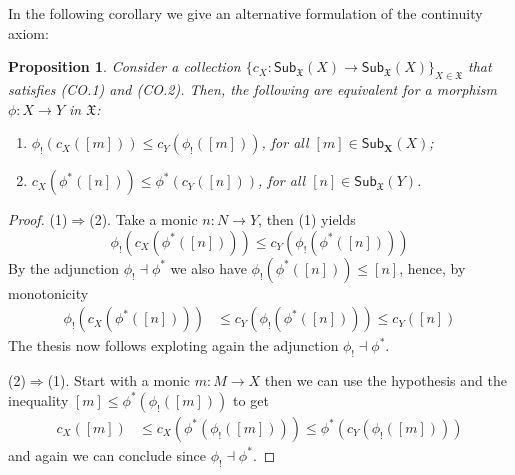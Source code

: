 \documentclass[12pt]{article}
\newtheorem{proposition}[lemma]{Proposition}
\theoremstyle{definition}
\def\X{\mathfrak X}
\numberwithin{equation}{section}
\newcommand{\catname}[1]{\mathbf{#1}}
\newcommand{\sub}[1]{\mathsf{Sub}_{\catname{#1}}}
\begin{document}
In the following corollary we give an alternative formulation of the continuity axiom:

\begin{proposition}\label{eq}
Consider a collection $\{c_X\colon \sub{\X}(X)\to \sub{\X}(X)\}_{X\in\X}$ that satisfies (CO.1) and (CO.2). Then, the following are equivalent for a morphism $\phi\colon X\to Y$ in $\X$:
\begin{enumerate}[\rm (1)]
\item $\phi_!(c_X([m]))\leq c_Y(\phi_!([m]))$, for all $[m]\in \sub{X}(X)$;
\item $c_X(\phi^*([n]))\leq \phi^*(c_Y([n]))$, for all $[n]\in \sub{\X}(Y)$.
\end{enumerate}
\end{proposition}
\begin{proof}
(1)$\Rightarrow$(2). Take a monic $n\colon N\to Y$, then (1) yields
\[\phi_!(c_X(\phi^*([n])))\leq c_Y(\phi_!(\phi^*([n])))\]
 By the adjunction $\phi_!\dashv \phi^*$ we also have  $\phi_!(\phi^*([n]))\leq [n]$, hence, by monotonicity
\begin{align*}
\phi_!(c_X(\phi^*([n])))&\leq c_Y(\phi_!(\phi^*([n])))\leq c_Y([n])
\end{align*}
The thesis now follows exploting again the adjunction $\phi_!\dashv \phi^*$.

\smallskip\noindent
(2)$\Rightarrow$(1). Start with a monic $m\colon M\to X$ then we can use the hypothesis and the inequality $[m]\leq \phi^*(\phi_!([m]))$ to get
\begin{align*}
c_X([m])&\leq c_X(\phi^*(\phi_!([m])))\leq \phi^*(c_Y(\phi_!([m]))) 
\end{align*} 
and again we can conclude since  $\phi_!\dashv \phi^*$.
\end{proof}





%
%
%
\end{document}
